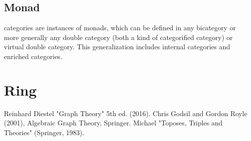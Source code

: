\documentclass[uplatex,dvipdfmx]{jsreport}
\begin{document}
\subsection{Monad}

\begin{tcolorbox}[colframe=ForestGreen, colback=ForestGreen!10!white, breakable ,colbacktitle=ForestGreen!40!white, coltitle=black,fonttitle=\bfseries\sffamily,
    title=]
    categories are instances of monads, which can be defined in any bicategory or more generally any double category (both a kind of categorified category) or virtual double category. This generalization includes internal categories and enriched categories.
\end{tcolorbox}

\section{Ring}

\begin{thebibliography}{9}
    Reinhard Diestel "Graph Theory" 5th ed. (2016).
    Chris Godsil and Gordon Royle (2001), Algebraic Graph Theory, Springer.
    Michael "Toposes, Triples and Theories" (Springer, 1983).
\end{thebibliography}
\end{document}
